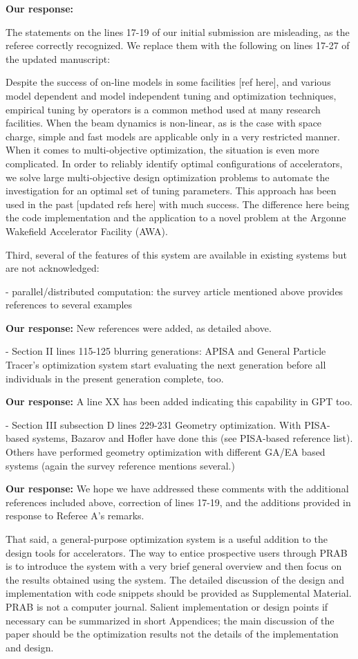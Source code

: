 \documentclass{article}
\begin{document}
{\bf Our response:} {\color{blue} The statements on the lines  17-19 of our initial submission are misleading, as
the referee correctly recognized. We replace them with the following on lines 17-27 of the updated manuscript:  

Despite the success of on-line models in some facilities [ref here], 
and various model dependent and model independent tuning and optimization techniques, 
empirical tuning by operators is a common method used at many research facilities.
When the beam dynamics is non-linear, as is the case with space charge, 
simple and fast models are applicable only in a very restricted manner. 
When it comes to multi-objective optimization, the situation is even more complicated.
In order to reliably identify optimal configurations of
accelerators, we solve large multi-objective design optimization
problems to automate the investigation for an optimal set of tuning parameters.
This approach has been used in the past [updated refs here] with much success.
The difference here being the code implementation and the application to a novel
problem at the Argonne Wakefield Accelerator Facility (AWA).
}

Third, several of the features of this system are available in
existing systems but are not acknowledged:

- parallel/distributed computation: the survey article mentioned above
provides references to several examples

{\bf Our response:} {\color{blue} New references were added, as detailed above.}

- Section II lines 115-125 blurring generations: APISA and General
Particle Tracer’s optimization system start evaluating the next
generation before all individuals in the present generation complete,
too.

{\bf Our response:} {\color{blue} A line XX has been added indicating this capability in GPT too.}

- Section III subsection D lines 229-231 Geometry optimization. With
PISA-based systems, Bazarov and Hofler have done this (see PISA-based
reference list). Others have performed geometry optimization with
different GA/EA based systems (again the survey reference mentions
several.)

{\bf Our response:} {\color{blue} We hope we have addressed these comments with the additional references included above, correction of lines 17-19, 
	and the additions provided in response to Referee A's remarks.}

That said, a general-purpose optimization system is a useful addition
to the design tools for accelerators. The way to entice prospective
users through PRAB is to introduce the system with a very brief
general overview and then focus on the results obtained using the
system. The detailed discussion of the design and implementation with
code snippets should be provided as Supplemental Material. PRAB is not
a computer journal. Salient implementation or design points if
necessary can be summarized in short Appendices; the main discussion
of the paper should be the optimization results not the details of the
implementation and design. 
\end{document}
